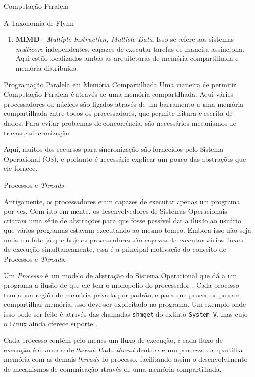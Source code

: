 \begin{section}{Computação Paralela}
\begin{subsection}{A Taxonomia de Flynn}
\begin{enumerate}
    \item \textbf{MIMD} - \textit{Multiple Instruction, Multiple Data}. Isso se refere
        aos sistemas \textit{multicore} independentes, capazes de executar tarefas
        de maneira assíncrona. Aqui estão localizados ambas as arquiteturas de memória
        compartilhada e memória distribuida.
\end{enumerate}
\end{subsection}

\begin{subsection}{Programação Paralela em Memória Compartilhada}
	Uma maneira de permitir Computação Paralela é através de
uma memória compartilhada. Aqui vários processadores ou núcleos
são ligados através de um barramento a uma memória compartilhada entre
todos os processadores, que permite leitura e escrita de dados.
Para evitar problemas de concorrência, são necessários mecanismos de
travas e sincronização.

	 Aqui, muitos dos recursos para sincronização são fornecidos pelo
Sistema Operacional (OS), e portanto é necessário explicar um pouco
das abstrações que ele fornece.

\begin{subsubsection}{Processos e \textit{Threads}}

	Antigamente, os processadores eram capazes de executar apenas
um programa por vez. Com isto em mente, os desenvolvedores
de Sistemas Operacionais criaram uma série de abstrações para que fosse
possível dar a ilusão ao usuário que vários programas estavam executando
ao mesmo tempo. Embora isso não seja mais um fato já que hoje os processadores
são capazes de executar vários fluxos de execução simultaneamente, essa
é a principal motivação do conceito de Processos e \textit{Threads}.

	Um \textit{Processo} é um modelo de abstração do Sistema Operacional que
dá a um programa a ilusão de que ele tem o monopólio do processador
\citep{love:2005}. Cada processo tem a sua região de memória privada por
padrão, e para que processos possam compartilhar memória, isso deve ser 
explicitado no programa. Um exemplo onde isso pode ser feito é através das
chamadas \texttt{shmget} do extinto \texttt{System V}, mas cujo o Linux ainda
oferece suporte \citep{shmget}.

Cada processo contém pelo menos um fluxo de execução, e cada fluxo de
execução é chamado de \textit{thread}. Cada \textit{thread} dentro
de um processo compartilha memória com as demais \textit{threads}
do processo, facilitando assim o desenvolvimento de mecanismos de
comunicação através de uma memória compartilhada.


\end{subsubsection}
\end{subsection}
\end{section}
